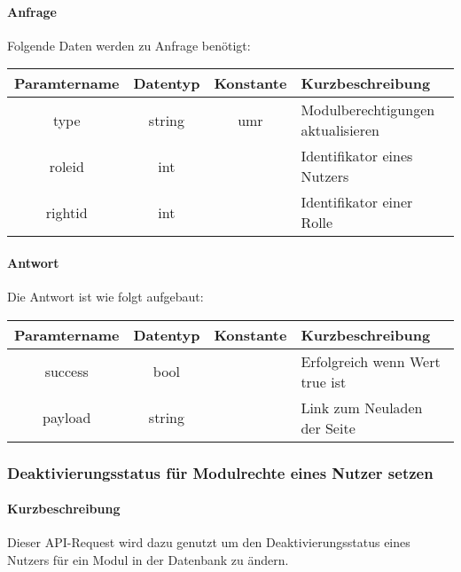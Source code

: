 \paragraph{Anfrage}Folgende Daten werden zu Anfrage benötigt:
\begin{table}[H]
	\begin{tabular}{|c|c|c|p{6.5cm}|}
		\hline
		\textbf{Paramtername} & \textbf{Datentyp} & \textbf{Konstante} & \textbf{Kurzbeschreibung}                                                                                               \\ \hline
		type                & string            & umr                & Modulberechtigungen aktualisieren \\ \hline
		roleid              & int               &                    & Identifikator eines Nutzers \\ \hline
		rightid             & int               &                    & Identifikator einer Rolle \\ \hline
	\end{tabular}
\end{table}
\paragraph{Antwort}Die Antwort ist wie folgt aufgebaut:
\begin{table}[H]
	\begin{tabular}{|c|c|c|p{6.5cm}|}
		\hline
		\textbf{Paramtername} & \textbf{Datentyp} & \textbf{Konstante} & \textbf{Kurzbeschreibung}            \\ \hline                
		success             & bool             &                 & Erfolgreich wenn Wert {\glqq true\grqq} ist \\ \hline
		payload             & string            &                 & Link zum Neuladen der Seite \\ \hline
	\end{tabular}
\end{table}
\subsubsection{Deaktivierungsstatus für Modulrechte eines Nutzer setzen}
\paragraph{Kurzbeschreibung}Dieser API-Request wird dazu genutzt um den Deaktivierungsstatus eines Nutzers für ein Modul in der Datenbank zu ändern.
